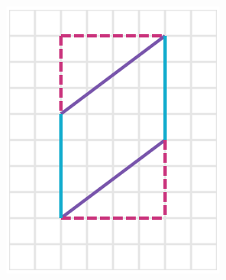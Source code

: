 \begin{solutionbox}{10cm}\footnotesize
    \begin{minipage}{0.4\textwidth}
        \begin{multicols}{2}
            \begin{figure}[H]
                \centering
                \includegraphics[width=0.9\linewidth]{../images/peri_paralelogramo_01a.png}
                \caption{}
                \label{fig:peri_paralelogramo_01a}
            \end{figure}
            \begin{figure}[H]
                \centering

\end{figure}
\end{multicols}
\end{minipage}
\end{solutionbox}
